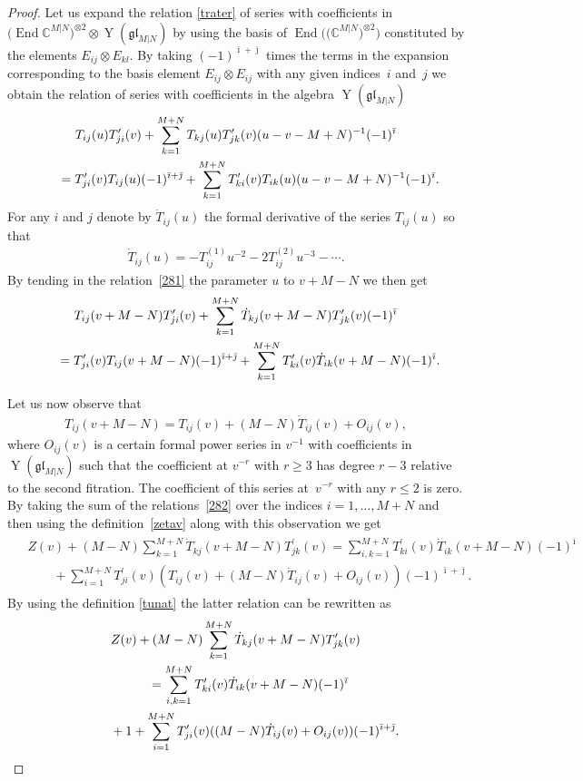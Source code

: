 \documentclass[10pt,a4paper]{amsart}
\numberwithin{equation}{section}
\def\1{^{-1}}
\def\bi{{\bar\imath }}
\def\bj{{\bar\jmath }}
\def\CC{{\mathbb{C}}}
\def\CMN{\CC^{M|N}}
\def\End{\operatorname{End}}
\def\ge{\geqslant}
\def\glMN{\mathfrak{gl}_{M|N}}
\def\le{\leqslant}
\def\ot{\otimes}
\def\TD{\dot{T}}
\def\TP{T^{\prime}}
\def\YMN{\operatorname{Y}(\glMN)}
\begin{document}
\begin{proof}
Let us expand the relation \eqref{trater} of series with
coefficients in $\big(\End\CMN\big)^{\ot 2}\ot\YMN$ by using
the basis of $\End\big(\big(\CMN\big)^{\ot 2}\big)$ constituted by the
elements $E_{ij}\ot E_{kl} $.
By taking $(-1)^{\bi+ \bj}$ times the terms in the expansion
corresponding to the basis element $E_{ij}\ot E_{ij}$
with any given indices~$i$ and~$j$ we obtain the relation of series
with coefficients in the algebra $\YMN$
\begin{gather}\notag
T_{ij}(u) \TP_{ji}(v)+
\sum_{k=1}^{M+N}
T_{kj}(u) \TP_{jk}(v) (u-v-M+N)\1 (-1)^{\bi}\\
\qquad{} =
\TP_{ji}(v) T_{ij}(u) (-1)^{\bi+ \bj}+
\sum_{k=1}^{M+N}
\TP_{ki}(v) T_{ik}(u) (u-v-M+N)\1(-1)^{\bi} .\label{281}
\end{gather}
For any $i$ and $j$ denote by $\TD_{ij}(u)$
the formal derivative of the series $T_{ij}(u)$ so that
\begin{gather}\label{TD}
\TD_{ij}(u)=- T^{(1)}_{ij}u^{-2}-2 T^{(2)}_{ij}u^{-3}-\cdots .
\end{gather}
By tending in the relation~\eqref{281} the parameter $u$ to $v+M-N$
we then get
\begin{gather}\notag
T_{ij}(v+M-N) \TP_{ji}(v)+
\sum_{k=1}^{M+N}
\TD_{kj}(v+M-N) \TP_{jk}(v) (-1)^{\bi}\\
\qquad{} =
\TP_{ji}(v) T_{ij}(v+M-N) (-1)^{\bi+ \bj}+
\sum_{k=1}^{M+N}
\TP_{ki}(v) \TD_{ik}(v+M-N) (-1)^{\bi} .\label{282}
\end{gather}

Let us now observe that
\begin{gather*}
T_{ij}(v+M-N)=T_{ij}(v)+(M-N) \TD_{ij}(v)+O_{ij}(v),
\end{gather*}
where $O_{ij}(v)$
is a certain formal power series in $v\1$ with coefficients in $\YMN$
such that the coefficient at $v^{-r}$ with $r\ge3$
has degree $r-3$ relative to the second fitration.
The coefficient of this series at~$v^{-r}$ with any $r\le2$ is zero.
By taking the sum of the relations~\eqref{282} over the indices
$i=1,\dots, M+N$ and then using the definition~\eqref{zetav}
along with this observation we get
\begin{gather*}\begin{split}&
 Z(v)+(M-N)\sum_{k=1}^{M+N}\TD_{kj}(v+M-N) \TP_{jk}(v)
 =
\sum_{i,k=1}^{M+N}
\TP_{ki}(v) \TD_{ik}(v+M-N) (-1)^{\bi}\\
& \qquad{} + \sum_{i=1}^{M+N}\TP_{ji}(v)(T_{ij}(v)+(M-N) \TD_{ij}(v)+O_{ij}(v)) (-1)^{\bi+ \bj} .
\end{split}
\end{gather*}
By using the definition \eqref{tunat} the latter relation can be rewritten as
\begin{gather}
\notag
Z(v)+(M-N)\sum_{k=1}^{M+N}\TD_{kj}(v+M-N) \TP_{jk}(v)\\
\qquad {} =\sum_{i,k=1}^{M+N}\TP_{ki}(v) \TD_{ik}(v+M-N) (-1)^{\bi}\nonumber\\
\qquad\quad{} +
1+\sum_{i=1}^{M+N}
\TP_{ji}(v) ((M-N) \TD_{ij}(v)+O_{ij}(v)) (-1)^{\bi+ \bj} .\label{283}
\end{gather}


\end{proof}
\end{document}
